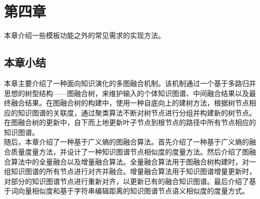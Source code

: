 \chapter{第四章}
本章介绍一些模板功能之外的常见需求的实现方法。
 
\section{本章小结} \label{sec:chap3章节小结}
本章主要介绍了一种面向知识演化的多图融合机制。该机制通过一个基于多路归并思想的树型结构——图融合树，来维护输入的个体知识图谱、中间融合结果以及最终融合结果。在图融合树的构建中，使用一种自底向上的建树方法，根据树节点相应的知识图谱的关联度，通过聚类算法不断对树节点进行分组并构建新的树节点。在图融合树的更新中，自下而上地更新叶子节点到根节点的路径中所有节点相应的知识图谱。\\
\indent 随后，本章介绍了一种基于广义熵的图融合算法。首先介绍了一种基于广义熵的融合质量度量方法，并设计了一种知识图谱节点相似度的度量方法。然后介绍了图融合算法中的全量融合以及增量融合算法。全量融合算法用于图融合树构建时，对一组知识图谱的所有节点进行对齐并融合。增量融合算法用于知识图谱增量更新时，对部分的知识图谱节点进行重新对齐，以更新已有的融合知识图谱。最后介绍了基于词向量相似度和基于字符串编辑距离的知识图谱节点语义相似度的度量方式。